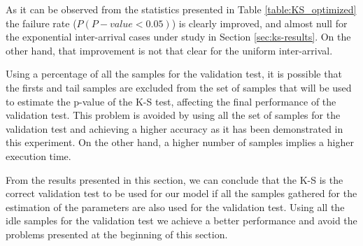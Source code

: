 As it can be observed from the statistics presented in Table \ref{table:KS_optimized} the failure rate ($P(P-value<0.05)$) is clearly improved, and almost null for the exponential inter-arrival cases under study in Section \ref{sec:ks-results}. On the other hand, that improvement is not that clear for the uniform inter-arrival.

Using a percentage of all the samples for the validation test, it is possible that the firsts and tail samples are excluded from the set of samples that will be used to estimate the p-value of the \acs{K-S} test, affecting the final performance of the validation test. This problem is avoided by using all the set of samples for the validation test and achieving a higher accuracy as it has been demonstrated in this experiment. On the other hand, a higher number of samples implies a higher execution time.

From the results presented in this section, we can conclude that the \acs{K-S} is the correct validation test to be used for our model if all the samples gathered for the estimation of the parameters are also used for the validation test. Using all the idle samples for the validation test we achieve a better performance and avoid the problems presented at the beginning of this section.